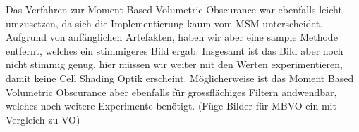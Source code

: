 \documentclass[runningheaders,a4paper]{llncs}
\begin{document}
Das Verfahren zur Moment Based Volumetric Obscurance war ebenfalls leicht umzusetzen, da sich die Implementierung kaum vom MSM unterscheidet. Aufgrund von anfänglichen Artefakten, haben wir aber eine sample Methode entfernt, welches ein stimmigeres Bild ergab. Insgesamt ist das Bild aber noch nicht stimmig genug, hier müssen wir weiter mit den Werten experimentieren, damit keine Cell Shading Optik erscheint. Möglicherweise ist das Moment Based Volumetric Obscurance aber ebenfalls für grossflächiges Filtern andwendbar, welches noch weitere Experimente benötigt.
(Füge Bilder für MBVO ein mit Vergleich zu VO)



\end{document}
